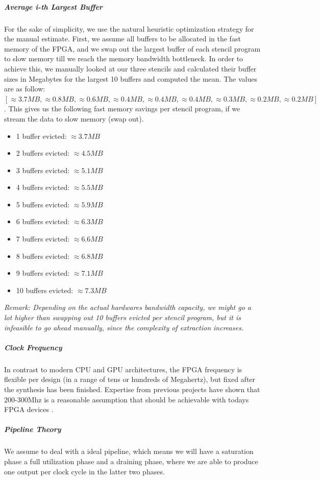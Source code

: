 \subparagraph{Average i-th Largest Buffer}
For the sake of simplicity, we use the natural heuristic optimization strategy for the manual estimate. First, we assume all buffers to be allocated in the fast memory of the FPGA, and we swap out the largest buffer of each stencil program to slow memory till we reach the memory bandwidth bottleneck. In order to achieve this, we manually looked at our three stencils and calculated their buffer sizes in Megabytes for the largest 10 buffers and computed the mean. The values are as follow:
$[\approx 3.7MB, \approx 0.8MB, \approx 0.6MB, \approx 0.4MB, \approx 0.4MB, \approx 0.4MB, \approx 0.3MB, \approx 0.2MB, \approx 0.2MB]$. This gives us the following fast memory savings per stencil program, if we stream the data to slow memory (swap out).
\begin{itemize}
	\item 1 buffer evicted:  $\approx 3.7MB$
	\item 2 buffers evicted:  $\approx 4.5MB$
	\item 3 buffers evicted:  $\approx 5.1MB$
	\item 4 buffers evicted:  $\approx 5.5MB$
	\item 5 buffers evicted:  $\approx 5.9MB$
	\item 6 buffers evicted:  $\approx 6.3MB$
	\item 7 buffers evicted:  $\approx 6.6MB$
	\item 8 buffers evicted:  $\approx 6.8MB$
	\item 9 buffers evicted:  $\approx 7.1MB$
	\item 10 buffers evicted:  $\approx 7.3MB$
\end{itemize}
\textit{Remark: Depending on the actual hardwares bandwidth capacity, we might go a lot higher than swapping out 10 buffers evicted per stencil program, but it is infeasible to go ahead manually, since the complexity of extraction increases.}


\subparagraph{Clock Frequency}
In contrast to modern CPU and GPU architectures, the FPGA frequency is flexible per design (in a range of tens or hundreds of Megahertz), but fixed after the synthesis has been finished. Expertise from previous projects have shown that 200-300Mhz is a reasonable assumption that should be achievable with todays FPGA devices \cite{label59}.

\subparagraph{Pipeline Theory}
We assume to deal with a ideal pipeline, which means we will have a saturation phase a full utilization phase and a draining phase, where we are able to produce one output per clock cycle in the latter two phases.


